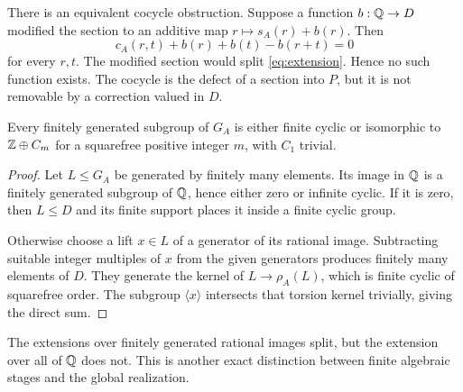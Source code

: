 There is an equivalent cocycle obstruction. Suppose a function $b:\mathbb Q\to D$ modified the section to an additive map $r\mapsto s_A(r)+b(r)$. Then
\[
c_A(r,t)+b(r)+b(t)-b(r+t)=0
\]
for every $r,t$. The modified section would split \eqref{eq:extension}. Hence no such function exists. The cocycle is the defect of a section into $P$, but it is not removable by a correction valued in $D$.

\begin{proposition}
\label{thm:fgsubgroups}
Every finitely generated subgroup of $G_A$ is either finite cyclic or isomorphic to $\mathbb Z\oplus C_m$ for a squarefree positive integer $m$, with $C_1$ trivial.
\end{proposition}
\begin{proof}
Let $L\le G_A$ be generated by finitely many elements. Its image in $\mathbb Q$ is a finitely generated subgroup of $\mathbb Q$, hence either zero or infinite cyclic. If it is zero, then $L\le D$ and its finite support places it inside a finite cyclic group.

Otherwise choose a lift $x\in L$ of a generator of its rational image. Subtracting suitable integer multiples of $x$ from the given generators produces finitely many elements of $D$. They generate the kernel of $L\to\rho_A(L)$, which is finite cyclic of squarefree order. The subgroup $\langle x\rangle$ intersects that torsion kernel trivially, giving the direct sum.
\end{proof}
The extensions over finitely generated rational images split, but the extension over all of $\mathbb Q$ does not. This is another exact distinction between finite algebraic stages and the global realization.

